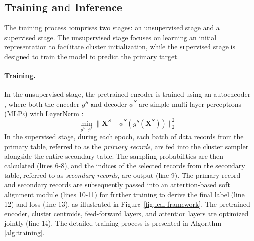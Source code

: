 \subsection{Training and Inference}\label{subsec:train-infer}

The training process comprises two stages: an unsupervised stage and a supervised stage. The unsupervised stage focuses on learning an initial representation to facilitate cluster initialization, while the supervised stage is designed to train the model to predict the primary target.

\paragraph{Training.} 
In the unsupervised stage, the pretrained encoder is trained using an autoencoder \cite{zhai2018autoencoder}, where both the encoder \(g^S\) and decoder \(\phi^S\) are simple multi-layer perceptrons (MLPs) with LayerNorm \cite{ba2016layer}:
\begin{equation}
\min_{g^S,\phi^S} \|\mathbf{X}^S - \phi^S(g^S(\mathbf{X}^S))\|_2^2
\end{equation}
In the supervised stage, during each epoch, each batch of data records from the primary table, referred to as the \textit{primary records}, are fed into the cluster sampler alongside the entire secondary table. The sampling probabilities are then calculated (lines 6-8), and the indices of the selected records from the secondary table, referred to as \textit{secondary records}, are output (line 9). The primary record and secondary records are subsequently passed into an attention-based soft alignment module (lines 10-11) for further training to derive the final label (line 12) and loss (line 13), as illustrated in Figure~\ref{fig:leal-framework}. The pretrained encoder, cluster centroids, feed-forward layers, and attention layers are optimized jointly (line 14). The detailed training process is presented in Algorithm \ref{alg:training}.

